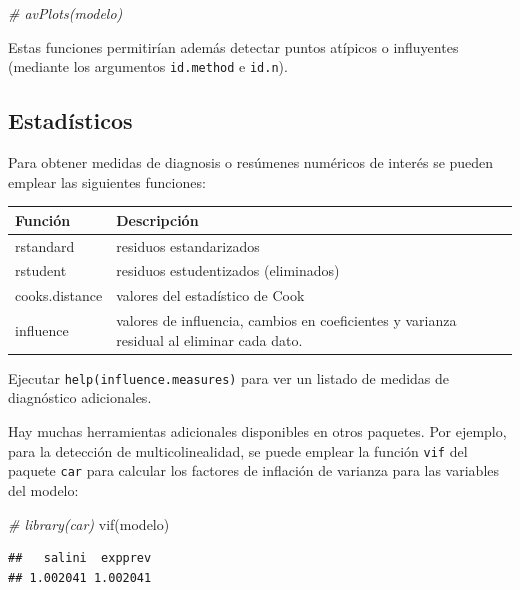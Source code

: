 \documentclass[
]{book}
\newenvironment{Shaded}{\begin{snugshade}}{\end{snugshade}}
\newcommand{\CommentTok}[1]{\textcolor[rgb]{0.56,0.35,0.01}{\textit{#1}}}
\newcommand{\FunctionTok}[1]{\textcolor[rgb]{0.00,0.00,0.00}{#1}}
\newcommand{\NormalTok}[1]{#1}
\theoremstyle{break}
\theoremstyle{nonumberplain}
\begin{document}
\begin{Shaded}
\begin{Highlighting}[]
\CommentTok{\# avPlots(modelo)}
\end{Highlighting}
\end{Shaded}

Estas funciones permitirían además detectar puntos atípicos o influyentes
(mediante los argumentos \texttt{id.method} e \texttt{id.n}).

\hypertarget{estaduxedsticos}{%
\subsection{Estadísticos}\label{estaduxedsticos}}

Para obtener medidas de diagnosis o resúmenes numéricos de interés se pueden emplear
las siguientes funciones:

\begin{longtable}[]{@{}
  >{\raggedright\arraybackslash}p{}
  >{\raggedright\arraybackslash}p{}@{}}
\toprule
Función & Descripción \\
\midrule
\endhead
rstandard & residuos estandarizados \\
rstudent & residuos estudentizados (eliminados) \\
cooks.distance & valores del estadístico de Cook \\
influence & valores de influencia, cambios en coeficientes y varianza residual al eliminar cada dato. \\
\bottomrule
\end{longtable}

Ejecutar \texttt{help(influence.measures)} para ver un listado de medidas de diagnóstico adicionales.

Hay muchas herramientas adicionales disponibles en otros paquetes.
Por ejemplo, para la detección de multicolinealidad, se puede emplear la función
\texttt{vif} del paquete \texttt{car} para calcular los factores de inflación de varianza para
las variables del modelo:

\begin{Shaded}
\begin{Highlighting}[]
\CommentTok{\# library(car)}
\FunctionTok{vif}\NormalTok{(modelo)}
\end{Highlighting}
\end{Shaded}

\begin{verbatim}
##   salini  expprev 
## 1.002041 1.002041
\end{verbatim}
\end{document}

